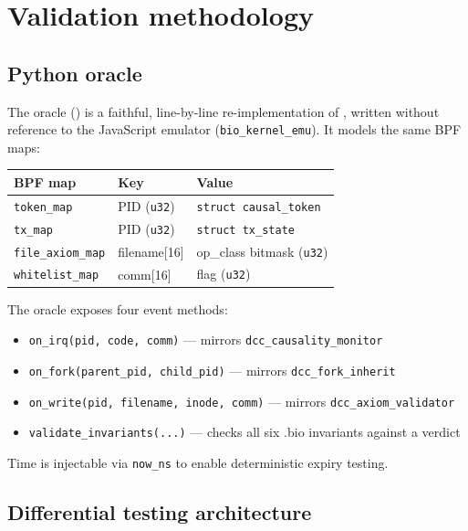 \documentclass[11pt,a4paper]{article}
\theoremstyle{definition}
\begin{document}
\section{Validation methodology}

\subsection{Python oracle}

The oracle () is a faithful, line-by-line
re-implementation of , written without reference to
the JavaScript emulator (\texttt{bio\_kernel\_emu}). It models the same BPF
maps:

\begin{center}
\begin{tabular}{lll}
\toprule
BPF map & Key & Value \\
\midrule
\texttt{token\_map}     & PID (\texttt{u32})     & \texttt{struct causal\_token} \\
\texttt{tx\_map}        & PID (\texttt{u32})     & \texttt{struct tx\_state} \\
\texttt{file\_axiom\_map} & filename[16]        & op\_class bitmask (\texttt{u32}) \\
\texttt{whitelist\_map} & comm[16]              & flag (\texttt{u32}) \\
\bottomrule
\end{tabular}
\end{center}

The oracle exposes four event methods:
\begin{itemize}[noitemsep]
  \item \texttt{on\_irq(pid, code, comm)} — mirrors \texttt{dcc\_causality\_monitor}
  \item \texttt{on\_fork(parent\_pid, child\_pid)} — mirrors \texttt{dcc\_fork\_inherit}
  \item \texttt{on\_write(pid, filename, inode, comm)} — mirrors \texttt{dcc\_axiom\_validator}
  \item \texttt{validate\_invariants(...)} — checks all six .bio invariants against a verdict
\end{itemize}

Time is injectable via \texttt{now\_ns} to enable deterministic expiry testing.

\subsection{Differential testing architecture}
\end{document}
